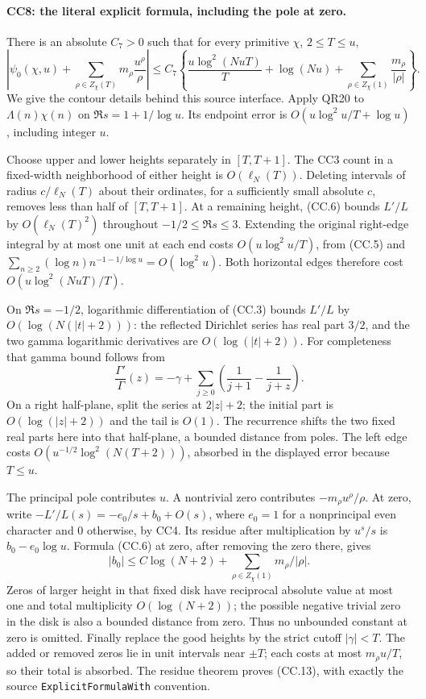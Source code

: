 \paragraph{CC8: the literal explicit formula, including the pole at zero.}
There is an absolute $C_7>0$ such that for every primitive
$\chi$, $2\le T\le u$,
\[
 \left|\psi_0(\chi,u)+
       \sum_{\rho\in Z_\chi(T)}m_\rho\frac{u^\rho}{\rho}\right|
 \le C_7\left\{
 \frac{u\log^2(NuT)}T+\log(Nu)
       +\sum_{\rho\in Z_\chi(1)}\frac{m_\rho}{|\rho|}\right\}.
                                                               \tag{CC.13}
\]
We give the contour details behind this source interface.
Apply QR20 to $\Lambda(n)\chi(n)$ on
$\Re s=1+1/\log u$. Its endpoint error is
$O(u\log^2u/T+\log u)$, including integer $u$.

Choose upper and lower heights separately in $[T,T+1]$.
The CC3 count in a fixed-width neighborhood of either height
is $O(\ell_N(T))$. Deleting intervals of radius
$c/\ell_N(T)$ about their ordinates, for a sufficiently small
absolute $c$, removes less than half of $[T,T+1]$.
At a remaining height, (CC.6) bounds $L'/L$ by
$O(\ell_N(T)^2)$ throughout $-1/2\le\Re s\le3$.
Extending the original right-edge integral by at most one unit
at each end costs $O(u\log^2u/T)$, from (CC.5) and
$\sum_{n\ge2}(\log n)n^{-1-1/\log u}=O(\log^2u)$.
Both horizontal edges therefore cost
$O(u\log^2(NuT)/T)$.

On $\Re s=-1/2$, logarithmic differentiation of (CC.3) bounds
$L'/L$ by $O(\log(N(|t|+2)))$: the reflected Dirichlet series
has real part $3/2$, and the two gamma logarithmic derivatives
are $O(\log(|t|+2))$. For completeness that gamma bound follows
from
\[
 \frac{\Gamma'}\Gamma(z)=-\gamma+
       \sum_{j\ge0}\left(\frac1{j+1}-\frac1{j+z}\right).
\]
On a right half-plane, split the series at $2|z|+2$; the initial
part is $O(\log(|z|+2))$ and the tail is $O(1)$.
The recurrence shifts the two fixed real parts here into that
half-plane, a bounded distance from poles. The left edge costs
$O(u^{-1/2}\log^2(N(T+2)))$, absorbed in the displayed error
because $T\le u$.

The principal pole contributes $u$. A nontrivial zero contributes
$-m_\rho u^\rho/\rho$. At zero, write
$-L'/L(s)=-e_0/s+b_0+O(s)$, where $e_0=1$ for a nonprincipal
even character and $0$ otherwise, by CC4. Its residue after
multiplication by $u^s/s$ is $b_0-e_0\log u$.
Formula (CC.6) at zero, after removing the zero there, gives
\[
 |b_0|\le C\log(N+2)+
                  \sum_{\rho\in Z_\chi(1)}m_\rho/|\rho|.
\]
Zeros of larger height in that fixed disk have reciprocal
absolute value at most one and total multiplicity $O(\log(N+2))$;
the possible negative trivial zero in the disk is also a bounded
distance from zero. Thus no unbounded constant at zero is omitted.
Finally replace the good heights by the strict cutoff $|\gamma|<T$.
The added or removed zeros lie in unit intervals near $\pm T$;
each costs at most $m_\rho u/T$, so their total is absorbed.
The residue theorem proves (CC.13), with exactly the source
\texttt{ExplicitFormulaWith} convention.

